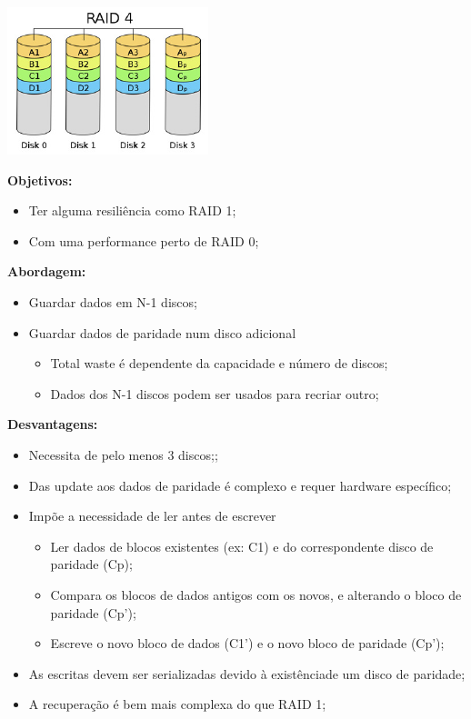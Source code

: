 \documentclass{article}
\begin{document}
\begin{center}
  \includegraphics[scale=0.6]{36}
\end{center}

\begin{flushleft}
  \textbf{Objetivos:}
  \begin{itemize}
    \item Ter alguma resiliência como RAID 1;
    \item Com uma performance perto de RAID 0;
  \end{itemize}

  \textbf{Abordagem:}
  \begin{itemize}
    \item Guardar dados em N-1 discos;
    \item Guardar dados de paridade num disco adicional
    \begin{itemize}
      \item Total waste é dependente da capacidade e número de discos;
      \item Dados dos N-1 discos podem ser usados para recriar outro;
    \end{itemize}
  \end{itemize}

  \pagebreak
  
  \textbf{Desvantagens:}
  \begin{itemize}
    \item Necessita de pelo menos 3 discos;;
    \item Das update aos dados de paridade é complexo e requer hardware específico;
    \item Impõe a necessidade de ler antes de escrever
    \begin{itemize}
      \item Ler dados de blocos existentes (ex: C1) e do correspondente disco de paridade (Cp);
      \item Compara os blocos de dados antigos com os novos, e alterando o bloco de paridade (Cp');
      \item Escreve o novo bloco de dados (C1') e o novo bloco de paridade (Cp');
    \end{itemize}
    \item As escritas devem ser serializadas devido à existênciade um disco de paridade;
    \item A recuperação é bem mais complexa do que RAID 1;
  \end{itemize}
\end{flushleft}
\end{document}
